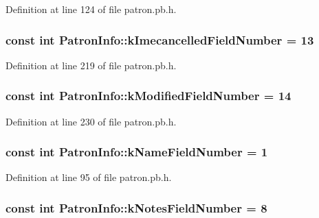 Definition at line 124 of file patron.\-pb.\-h.

\hypertarget{classPatronInfo_ad0bac69b4ef8c8c239051bf8e260f9aa}{
\subsubsection[{k\-Imecancelled\-Field\-Number}]{\setlength{\rightskip}{0pt plus 5cm}const int Patron\-Info\-::k\-Imecancelled\-Field\-Number = 13\hspace{0.3cm}{\ttfamily [static]}}}\label{classPatronInfo_ad0bac69b4ef8c8c239051bf8e260f9aa}


Definition at line 219 of file patron.\-pb.\-h.

\hypertarget{classPatronInfo_a72164d83ef4f339fea868b67b69b8696}{
\subsubsection[{k\-Modified\-Field\-Number}]{\setlength{\rightskip}{0pt plus 5cm}const int Patron\-Info\-::k\-Modified\-Field\-Number = 14\hspace{0.3cm}{\ttfamily [static]}}}\label{classPatronInfo_a72164d83ef4f339fea868b67b69b8696}


Definition at line 230 of file patron.\-pb.\-h.

\hypertarget{classPatronInfo_ab205c98473d062e4efb0335340766785}{
\subsubsection[{k\-Name\-Field\-Number}]{\setlength{\rightskip}{0pt plus 5cm}const int Patron\-Info\-::k\-Name\-Field\-Number = 1\hspace{0.3cm}{\ttfamily [static]}}}\label{classPatronInfo_ab205c98473d062e4efb0335340766785}


Definition at line 95 of file patron.\-pb.\-h.

\hypertarget{classPatronInfo_a7abbec939f6e7af594c76e389f015088}{
\subsubsection[{k\-Notes\-Field\-Number}]{\setlength{\rightskip}{0pt plus 5cm}const int Patron\-Info\-::k\-Notes\-Field\-Number = 8\hspace{0.3cm}{\ttfamily [static]}}}\label{classPatronInfo_a7abbec939f6e7af594c76e389f015088}


